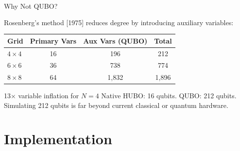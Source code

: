 \documentclass[aspectratio=169]{beamer}
\begin{document}
\begin{frame}{Why Not QUBO?}

Rosenberg's method [1975] reduces degree by introducing auxiliary variables:

\bigskip
\begin{table}
\centering
\begin{tabular}{@{} lccc @{}}
    \toprule
    Grid & Primary Vars & Aux Vars (QUBO) & Total \\
    \midrule
    $4\times4$ & 16 & 196 & 212 \\
    $6\times6$ & 36 & 738 & 774 \\
    $8\times8$ & 64 & 1,832 & 1,896 \\
    \bottomrule
\end{tabular}
\end{table}

\bigskip
\begin{alertblock}{13$\times$ variable inflation for $N=4$}
Native HUBO: 16 qubits. QUBO: 212 qubits. Simulating 212 qubits is far beyond current classical or quantum hardware.
\end{alertblock}
\end{frame}

\section{Implementation}
\end{document}
